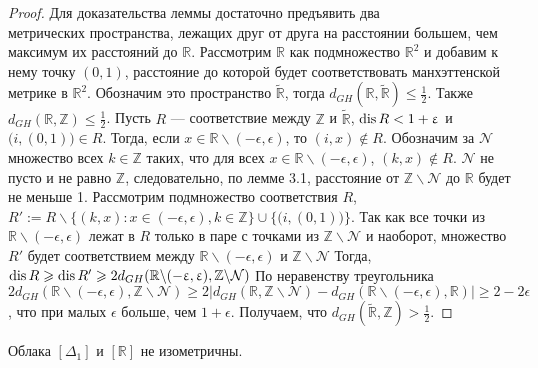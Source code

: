 \begin{proof}
	Для доказательства леммы достаточно предъявить два \\метрических пространства, лежащих друг от друга на расстоянии большем, чем максимум их расстояний до $\mathbb{R}$. Рассмотрим $\mathbb{R}$ как подмножество $\mathbb{R}^2$ и добавим к нему точку $(0,1)$, расстояние до которой будет соответствовать манхэттенской метрике в $\mathbb{R}^2$. Обозначим это пространство $\widetilde{\mathbb{R}}$, тогда $d_{GH}(\mathbb{R}, \widetilde{\mathbb{R}}) \le \frac{1}{2}$. Также $d_{GH}(\mathbb{R},\mathbb{Z}) \le \frac{1}{2}$. Пусть $R$ --- соответствие между $\mathbb{Z}$ и $\widetilde{\mathbb{R}}$, $\operatorname{dis} R < 1 + \upvarepsilon$ и $\big(i, (0,1)\big) \in R$. Тогда, если $x \in \mathbb{R}\backslash(-\epsilon, \epsilon)$, то $(i, x) \notin R$. Обозначим за $\mathcal{N}$ множество всех $k \in \mathbb{Z}$ таких, что для всех $x \in \mathbb{R}\backslash(-\epsilon, \epsilon)$, $(k,x) \notin R$. $\mathcal{N}$ не пусто и не равно $\mathbb{Z}$, следовательно, по лемме 3.1, расстояние от $\mathbb{Z} \backslash \mathcal{N}$ до $\mathbb{R}$ будет не меньше 1. Рассмотрим подмножество соответствия $R$, $R' := R \backslash \{(k,x): x\in (-\epsilon, \epsilon), k \in \mathbb{Z}\} \cup \{\big(i, (0,1)\big)\}$. Так как все точки из $\mathbb{R}\backslash(-\epsilon, \epsilon)$ лежат в $R$ только в паре с точками из $ \mathbb{Z} \backslash \mathcal{N}$ и наоборот, множество $R'$ будет соответствием между $\mathbb{R}\backslash(-\epsilon, \epsilon)$ и $ \mathbb{Z} \backslash \mathcal{N}$  Тогда, $\operatorname{dis} R \geqslant \operatorname{dis} R' \geqslant 2d_{GH}(\mathbb{R}\backslash(-\upvarepsilon, \upvarepsilon), \mathbb{Z} \backslash \mathcal{N})$ По неравенству треугольника $2d_{GH}(\mathbb{R}\backslash(-\epsilon, \epsilon), \mathbb{Z} \backslash \mathcal{N}) \ge 2|d_{GH}(\mathbb{R}, \mathbb{Z} \backslash \mathcal{N}) - d_{GH}(\mathbb{R}\backslash(-\epsilon, \epsilon), \mathbb{R})| \ge 2 - 2\epsilon$, что при малых $\epsilon$ больше, чем $1 + \epsilon$. Получаем, что $d_{GH}(\widetilde{\mathbb{R}}, \mathbb{Z}) > \frac{1}{2}$.    
\end{proof}

\begin{corollary}
	Облака $[\Delta_1]$ и $[\mathbb{R}]$ не изометричны.
\end{corollary}

